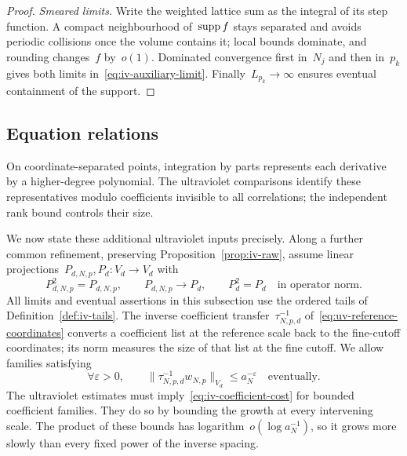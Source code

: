 \begin{proof}
\emph{Smeared limits.}
Write the weighted lattice sum as the integral of its step function. A compact neighbourhood of~$\operatorname{supp} f$ stays separated and avoids periodic collisions once the volume contains it; local bounds dominate, and rounding changes~$f$ by~$o(1)$.
Dominated convergence first in~$N_j$ and then in~$p_k$ gives both limits in~\eqref{eq:iv-auxiliary-limit}.
Finally~$L_{p_k}\to\infty$ ensures eventual containment of the support.
\end{proof}

\subsection{Equation relations}\label{subsec:iv-equations}

On coordinate-separated points, integration by parts represents each derivative by a higher-degree polynomial. The ultraviolet comparisons identify these representatives modulo coefficients invisible to all correlations; the independent rank bound controls their size.

We now state these additional ultraviolet inputs precisely.
Along a further common refinement, preserving Proposition~\ref{prop:iv-raw}, assume linear projections~$P_{d,N,p},P_d:V_d\to V_d$ with
\begin{equation}\label{eq:iv-projections}
 P_{d,N,p}^2=P_{d,N,p},\qquad
 P_{d,N,p}\longrightarrow P_d,\qquad P_d^2=P_d
 \quad\text{in operator norm}.
\end{equation}
All limits and eventual assertions in this subsection use the ordered tails of Definition~\ref{def:iv-tails}.
The inverse coefficient transfer~$\tau_{N,p,d}^{-1}$ of~\eqref{eq:uv-reference-coordinates} converts a coefficient list at the reference scale back to the fine-cutoff coordinates; its norm measures the size of that list at the fine cutoff.
We allow families satisfying
\begin{equation}\label{eq:iv-coefficient-cost}
 \forall\varepsilon>0,\qquad
 \|\tau_{N,p,d}^{-1}w_{N,p}\|_{V_d}\le a_N^{-\varepsilon}
 \quad\text{eventually}.
\end{equation}
The ultraviolet estimates must imply~\eqref{eq:iv-coefficient-cost} for bounded coefficient families.
They do so by bounding the growth at every intervening scale. The product of these bounds has logarithm~$o(\log a_N^{-1})$, so it grows more slowly than every fixed power of the inverse spacing.

